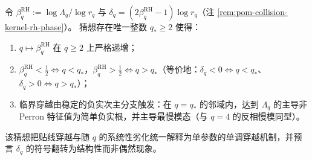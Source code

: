 \begin{conjecture}[指数口径的单调性与唯一临界穿越]\label{conj:pom-deltaq-beta-monotone-unique-crossing}
令 \(\beta^{\mathrm{RH}}_q:=\log\Lambda_q/\log r_q\) 与 \(\delta_q=(2\beta^{\mathrm{RH}}_q-1)\log r_q\)（注 \ref{rem:pom-collision-kernel-rh-phase}）。
猜想存在唯一整数 \(q_\ast\ge 2\) 使得：
\begin{enumerate}
  \item \(q\mapsto \beta^{\mathrm{RH}}_q\) 在 \(q\ge 2\) 上严格递增；
  \item \(\beta^{\mathrm{RH}}_q<\tfrac12\iff q<q_\ast\)，\(\beta^{\mathrm{RH}}_q>\tfrac12\iff q>q_\ast\)（等价地：\(\delta_q<0\iff q<q_\ast\)、\(\delta_q>0\iff q>q_\ast\)）；
  \item 临界穿越由稳定的负实次主分支触发：在 \(q=q_\ast\) 的邻域内，达到 \(\Lambda_q\) 的主导非 Perron 特征值为简单负实根，并主导最慢模态（与 \(q=4\) 的反相慢模同型）。
\end{enumerate}
该猜想把贴线穿越与随 \(q\) 的系统性劣化统一解释为单参数的单调穿越机制，并预言 \(\delta_q\) 的符号翻转为结构性而非偶然现象。
\end{conjecture}
